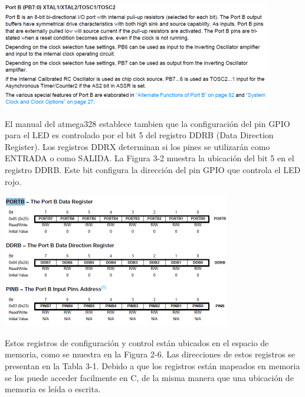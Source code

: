 \documentclass[12pt]{article}
\begin{document}
\begin{center}
\includegraphics{descripcion-registro.png}
\end{center}



El manual del atmega328 establece tambien que la configuración del pin GPIO para el
LED es controlado por el bit 5 del registro DDRB (Data Direction Register).
Los registros DDRX determinan si los pines se utilizarán como ENTRADA
o como SALIDA.
La Figura 3-2 muestra la ubicación del bit 5 en el registro DDRB. Este
bit configura la dirección del pin GPIO que controla el LED rojo.

\begin{center}
\includegraphics{portb-ddrb.png}
\end{center}

Estos registros de configuración y control están ubicados en el espacio de memoria, como se muestra en la Figura 2-6.
Las direcciones de estos registros se presentan en la Tabla 3-1. 
Debido a que los registros están mapeados en memoria se los puede
acceder facilmente en C, de la misma manera que una ubicación de memoria
es leída o escrita.

\end{document}
